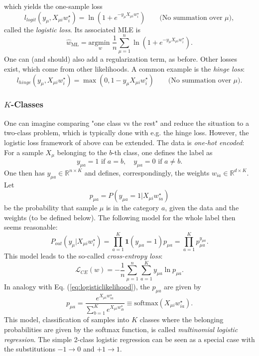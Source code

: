 \documentclass{article}
\begin{document}
which yields the one-sample loss
\begin{equation}
    l_{logit}(y_{\mu}, X_{\mu i} w^{\star}_i)
    =
    \ln\left(1+e^{-y_{\mu} X_{\mu i} w^{\star}_i}\right)
    \quad\quad \text{(No summation over $\mu$)},
\end{equation}
called the \emph{logistic loss}. Its associated MLE is
\begin{equation}
    \hat{w}_{\text{ML}} = \underset{w}{\text{argmin }} \frac{1}{n}\sum_{\mu = 1}^{n}
    \ln\left(1+e^{-y_{\mu} X_{\mu i} w^{\star}_i}\right).
\end{equation}
One can (and should) also add a regularization term, as before. Other losses exist, which come from other likelihoods. A common example is the \emph{hinge loss}:
\begin{equation}
    l_{hinge}(y_{\mu}, X_{\mu i} w^{\star}_i)
    =
    \max (0,1-y_{\mu} X_{\mu i} w^{\star}_i)
    \quad\quad \text{(No summation over $\mu$)}.
\end{equation}
\subsubsection*{$K$-Classes}
One can imagine comparing "one class vs the rest" and reduce the situation to a two-class problem, which is typically done with e.g. the hinge loss. However, the logistic loss framework of above can be extended. The data is \emph{one-hot encoded}: For a sample $X_{\mu}$ belonging to the $b$-th class, one defines the label as
\begin{equation}
    y_{\mu a} = 1 \text{ if } a=b,\quad y_{\mu a} = 0 \text{ if } a\neq b.
\end{equation}
One then has $y_{\mu a} \in \mathbb{R}^{n\times K}$ and defines, correspondingly, the weights $w_{i a} \in \mathbb{R}^{d\times K}$. Let $$p_{\mu a} = P(y_{\mu a} = 1| X_{\mu i} w^{\star}_{ia})$$ be the probability that sample $\mu$ is in the category $a$, given the data and the weights (to be defined below). The following model for the whole label then seems reasonable:
\begin{equation}
    P_{out}(y_{\mu}| X_{\mu i} w^{\star}_i)
    =
    \prod_{a=1}^{K} \mathbf{1}(y_{\mu a}=1) p_{\mu a}
    =
    \prod_{a=1}^{K} p_{\mu a}^{y_{\mu a}}.
\end{equation}
This model leads to the so-called \emph{cross-entropy loss}:
\begin{equation}
    \mathcal{L}_{CE}(w)
    =
    -\frac{1}{n} \sum_{\mu = 1}^{n}\sum_{a=1}^{K}
    y_{\mu a} \ln{p_{\mu a}}.
\end{equation}
In analogy with Eq. (\ref{eq:logisticlikelihood}), the $p_{\mu a}$ are given by
\begin{equation}
    p_{\mu a}
    =
    \frac{e^{X_{\mu i} w^{\star}_{ia}}}{\sum_{b=1}^{K} e^{X_{\mu i} w^{\star}_{ib}}}
    \equiv
    \text{softmax}(X_{\mu i} w^{\star}_{ia}).
\end{equation}
This model, classification of samples into $K$ classes where the belonging probabilities are given by the softmax function, is called \emph{multinomial logistic regression}. The simple 2-class logistic regression can be seen as a special case with the substitutions $-1\rightarrow 0$ and $+1\rightarrow 1$.
\end{document}

